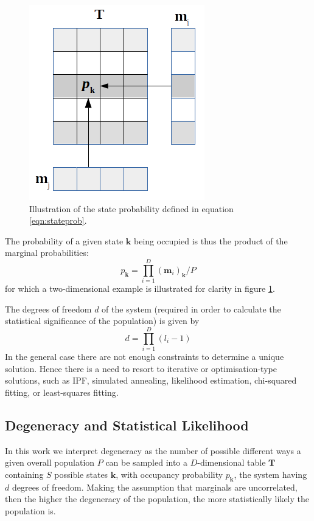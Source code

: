 \documentclass{JASSS}
\begin{document}
\begin{figure}[!t]
\centering
\includegraphics[width=0.35\linewidth]{figures/equation10} 
\caption{Illustration of the state probability defined in equation \ref{eqn:stateprob}.}
\label{fig:stateprob}
\end{figure}

The probability of a given state \(\mathbf{k}\) being occupied is thus
the product of the marginal probabilities:
\begin{equation}
p_{\mathbf{k}} = \prod\limits_{i=1}^{D}(\mathbf{m}_i)_\mathbf{k}/P
\label{eqn:stateprob}
\end{equation}
for which a two-dimensional example is illustrated for clarity in figure \ref{fig:stateprob}.

The degrees of freedom \(d\) of the system (required in order to
calculate the statistical significance of the population) is given by
\begin{equation}
d=\prod\limits_{i=1}^{D}(l_i-1)
\end{equation}
In the general case there are not enough constraints to determine a
unique solution. Hence there is a need to resort to iterative or
optimisation-type solutions, such as IPF, simulated annealing,
likelihood estimation, chi-squared fitting, or least-squares fitting.

\subsection{Degeneracy and Statistical
Likelihood}\label{degeneracy-and-statistical-likelihood}

In this work we interpret degeneracy as the number of possible different
ways a given overall population \(P\) can be sampled into a \(D\)-dimensional table
\(\mathbf{T}\) containing \(S\) possible states \(\mathbf{k}\), with
occupancy probability \(p_\mathbf{k}\), the system having \(d\) degrees
of freedom. Making the assumption that marginals are uncorrelated, then the
higher the degeneracy of the population, the more statistically likely
the population is.
\end{document}
